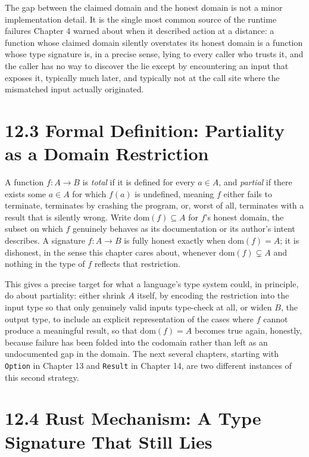 \documentclass[11pt]{book}
\begin{document}
The gap between the claimed domain and the honest domain is not a minor implementation detail. It is the single most common source of the runtime failures Chapter 4 warned about when it described action at a distance: a function whose claimed domain silently overstates its honest domain is a function whose type signature is, in a precise sense, lying to every caller who trusts it, and the caller has no way to discover the lie except by encountering an input that exposes it, typically much later, and typically not at the call site where the mismatched input actually originated.

\section*{12.3 Formal Definition: Partiality as a Domain Restriction}

A function $f: A \rightarrow B$ is \emph{total} if it is defined for every $a \in A$, and \emph{partial} if there exists some $a \in A$ for which $f(a)$ is undefined, meaning $f$ either fails to terminate, terminates by crashing the program, or, worst of all, terminates with a result that is silently wrong. Write $\mathrm{dom}(f) \subseteq A$ for $f$'s honest domain, the subset on which $f$ genuinely behaves as its documentation or its author's intent describes. A signature $f: A \rightarrow B$ is fully honest exactly when $\mathrm{dom}(f) = A$; it is dishonest, in the sense this chapter cares about, whenever $\mathrm{dom}(f) \subsetneq A$ and nothing in the type of $f$ reflects that restriction.

This gives a precise target for what a language's type system could, in principle, do about partiality: either shrink $A$ itself, by encoding the restriction into the input type so that only genuinely valid inputs type-check at all, or widen $B$, the output type, to include an explicit representation of the cases where $f$ cannot produce a meaningful result, so that $\mathrm{dom}(f) = A$ becomes true again, honestly, because failure has been folded into the codomain rather than left as an undocumented gap in the domain. The next several chapters, starting with \texttt{Option} in Chapter 13 and \texttt{Result} in Chapter 14, are two different instances of this second strategy.

\section*{12.4 Rust Mechanism: A Type Signature That Still Lies}
\end{document}
